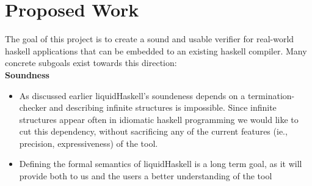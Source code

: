 \section*{Proposed Work}

The goal of this project is to create a sound and usable verifier
for real-world haskell applications that can be embedded to an
existing haskell compiler.
%
Many concrete subgoals exist towards this direction: \\

\textbf{Soundness}
\begin{itemize}
\item
As discussed earlier liquidHaskell's soundeness
depends on a termination-checker and
describing infinite structures is impossible.
%
Since infinite structures appear often in 
idiomatic haskell programming
we would like to cut this dependency, 
without sacrificing any of the current 
features (ie., precision, expressiveness) of the tool.



\item 
Defining the formal semantics of liquidHaskell
is a long term goal, 
as it will provide both to us and the users 
a better understanding of the tool
\end{itemize}


